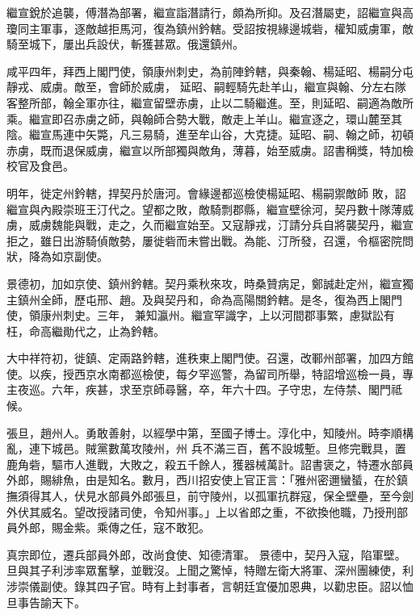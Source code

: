 \begin{pinyinscope}
 繼宣銳於追襲，傅潛為部署，繼宣詣潛請行，頗為所抑。及召潛屬吏，詔繼宣與高瓊同主軍事，逐敵越拒馬河，復為鎮州鈐轄。受詔按視緣邊城砦，權知威虜軍，敵騎至城下，屢出兵設伏，斬獲甚眾。俄還鎮州。



 咸平四年，拜西上閣門使，領康州刺史，為前陣鈐轄，與秦翰、楊延昭、楊嗣分屯靜戎、威虜。敵至，會師於威虜，
 延昭、嗣輕騎先赴羊山，繼宣與翰、分左右隊客整所部，翰全軍亦往，繼宣留壁赤虜，止以二騎繼進。至，則延昭、嗣適為敵所乘。繼宣即召赤虜之師，與翰師合勢大戰，敵走上羊山。繼宣逐之，環山麓至其陰。繼宣馬連中矢斃，凡三易騎，進至牟山谷，大克捷。延昭、嗣、翰之師，初頓赤虜，既而退保威虜，繼宣以所部獨與敵角，薄暮，始至威虜。詔書稱獎，特加檢校官及食邑。



 明年，徙定州鈐轄，捍契丹於唐河。會緣邊都巡檢使楊延昭、楊嗣禦敵師
 敗，詔繼宣與內殿崇班王汀代之。望都之敗，敵騎剽郡縣，繼宣壁徐河，契丹數十隊薄威虜，威虜魏能與戰，走之，久而繼宣始至。又寇靜戎，汀請分兵自將襲契丹，繼宣拒之，雖日出游騎偵敵勢，屢徙砦而未嘗出戰。為能、汀所發，召還，令樞密院問狀，降為如京副使。



 景德初，加如京使、鎮州鈐轄。契丹乘秋來攻，時桑贊病足，鄭誠赴定州，繼宣獨主鎮州全師，歷屯邢、趙。及與契丹和，命為高陽關鈐轄。是冬，復為西上閣門使，領康州刺史。三年，
 兼知瀛州。繼宣罕識字，上以河間郡事繁，慮獄訟有枉，命高繼勛代之，止為鈐轄。



 大中祥符初，徙鎮、定兩路鈐轄，進秩東上閣門使。召還，改鄆州部署，加四方館使。以疾，授西京水南都巡檢使，每夕罕巡警，為留司所舉，特詔增巡檢一員，專主夜巡。六年，疾甚，求至京師尋醫，卒，年六十四。子守忠，左侍禁、閣門祗候。



 張旦，趙州人。勇敢善射，以經學中第，至國子博士。淳化中，知陵州。時李順構亂，連下城邑。賊黨數萬攻陵州，州
 兵不滿三百，舊不設城塹。旦修完戰具，置鹿角砦，驅市人進戰，大敗之，殺五千餘人，獲器械萬計。詔書褒之，特遷水部員外郎，賜緋魚，由是知名。數月，西川招安使上官正言：「雅州密邇蠻蜑，在於鎮撫須得其人，伏見水部員外郎張旦，前守陵州，以孤軍抗群寇，保全壁壘，至今劍外伏其威名。望改授諸司使，令知州事。」上以省郎之重，不欲換他職，乃授刑部員外郎，賜金紫。乘傳之任，寇不敢犯。



 真宗即位，遷兵部員外郎，改尚食使、知德清軍。
 景德中，契丹入寇，陷軍壁。旦與其子利涉率眾奮擊，並戰沒。上聞之驚悼，特贈左衛大將軍、深州團練使，利涉崇儀副使。錄其四子官。時有上封事者，言朝廷宜優加恩典，以勸忠臣。詔以恤旦事告諭天下。




\end{pinyinscope}
